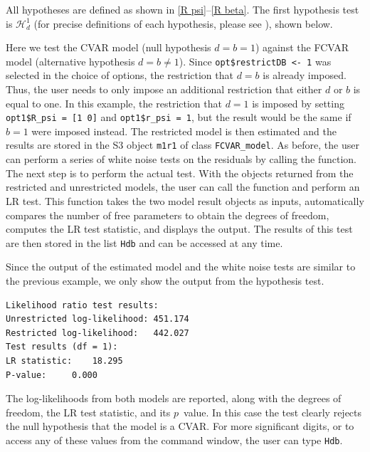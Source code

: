 \documentclass[article]{jss}
\newcommand{\fct}[1]{\code{#1()}}
\begin{document}
All hypotheses are defined as shown in \eqref{R psi}--\eqref{R beta}. The first hypothesis test is $\mathscr{H}_d^1$ (for precise definitions of each hypothesis, please see \cite{JNP2014}), 
shown below. 




Here we test the CVAR model (null hypothesis $d=b=1$) against the FCVAR model (alternative hypothesis $d=b$). Since \verb|opt$restrictDB <- 1| was selected in the choice of options,
the restriction that $d=b$ is already imposed. Thus, the user needs to only impose an additional restriction that either $d$ or $b$ is equal to one. In this example, the restriction that $d=1$ is imposed by setting \verb|opt1$R_psi = [1 0]| and \verb|opt1$r_psi = 1|, but the result would be the same if $b=1$ were imposed instead. The restricted model is then estimated and the results are stored in the S3 object \verb|m1r1| of class \verb|FCVAR_model|. As before, the user can perform a series of white noise tests on the residuals by calling the \fct{MVWNtest} function. The next step is to perform the actual test. With the objects returned from the restricted and unrestricted models, the user can call the function \fct{FCVARhypoTest} and perform an LR test. This function takes the two model result objects as inputs, automatically compares the number of free parameters to obtain the degrees of freedom, computes the LR test statistic, and displays the output. The results of this test are then stored in the list \verb|Hdb| and can be accessed at any time.

Since the output of the estimated model and the white noise tests are similar to the previous example, we only show the output from the hypothesis test. 

\begin{verbatim}
Likelihood ratio test results:
Unrestricted log-likelihood: 451.174
Restricted log-likelihood:   442.027
Test results (df = 1):
LR statistic: 	 18.295
P-value: 	 0.000
\end{verbatim}

The log-likelihoods from both models are reported, along with the degrees of freedom, the LR test statistic, and its $p$~value. In this case the test clearly rejects the null hypothesis that the model is a CVAR. For more significant digits, or to access any of these values from the command window, the user can type \verb|Hdb|.
\end{document}
